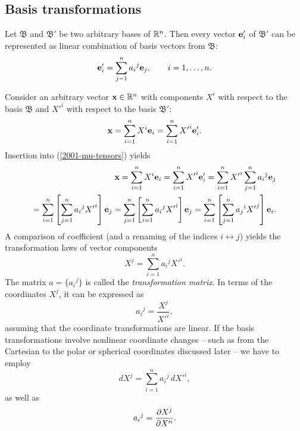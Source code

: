 \subsection{Basis transformations}
Let
${\mathfrak B}$
and
${\mathfrak B'}$
be two arbitrary bases of
${\Bbb R}^n$.
Then every vector ${\bf e}'_i$ of
${\mathfrak B'}$
can be represented as linear combination of basis vectors from
${\mathfrak B}$:
\begin{equation}
{\bf e}'_i=\sum_{j=1}^n {a_i}^j {\bf e}_j, \qquad i=1,\ldots , n  .
\label{2001-mu-tensors}
\end{equation}


Consider an arbitrary vector ${\bf x} \in {\Bbb R}^n$
with components $X^i$ with respect to the basis
${\mathfrak B}$
and   ${X'}^i$  with respect to the basis
${\mathfrak B'}$:
\begin{equation}
{\bf x}
=\sum_{i=1}^n X^i {\bf e}_i
=\sum_{i=1}^n {X'}^i {\bf e}'_i
.
\end{equation}
Insertion into (\ref{2001-mu-tensors}) yields
\begin{equation}
\begin{split}
{\bf x}
=\sum_{i=1}^n X^i {\bf e}_i
=\sum_{i=1}^n {X'}^i {\bf e}'_i
=\sum_{i=1}^n {X'}^i \sum_{j=1}^n {a_i}^j {\bf e}_j\\
=
\sum_{i=1}^n\left[\sum_{j=1}^n {a_i}^j{X'}^i \right] {\bf e}_j
=
\sum_{j=1}^n\left[ \sum_{i=1}^n {a_i}^j{X'}^i \right] {\bf e}_j
=
\sum_{i=1}^n\left[ \sum_{j=1}^n {a_j}^i{X'}^j \right] {\bf e}_i
.
\end{split}
\end{equation}
A comparison of coefficient
(and a renaming of the
indices $i \leftrightarrow j$)
yields the transformation laws of vector components
\begin{equation}
X^j   = \sum_{i=1}^n {a_i}^j{X'}^i.
\label{2012-m-ch-di-choic}
\end{equation}
The matrix $a=\{{a_i}^j\}$ is called the {\em transformation matrix}.
In terms of the coordinates $X^j$, it can be expressed as
\begin{equation}
{a_i}^j =\frac{  X^j }{  X'^i}  ,
\label{2001-mu-tensor-tl1}
\end{equation}
assuming that the coordinate transformations are linear.
If the basis transformations involve nonlinear coordinate changes -- such as from the
Cartesian to the polar or spherical coordinates discussed later -- we have to employ
\begin{equation}
dX^j   = \sum_{i=1}^n {a_i}^j \,d{X'}^i  ,
\label{2012-m-ch-di-choic11}
\end{equation}
as well as
\begin{equation}
{a_i}^j ={\partial X^j \over \partial X'^i}   .
\label{2001-mu-tensor-tl11}
\end{equation}


